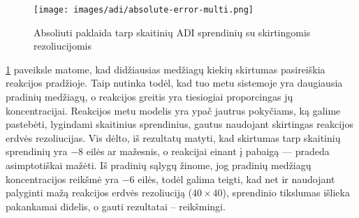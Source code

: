 \newpage

\begin{figure}[h!]
  \centering
  \texttt{[image: images/adi/absolute-error-multi.png]}
  \caption{Absoliuti paklaida tarp skaitinių ADI sprendinių su skirtingomis rezoliucijomis}
  \label{fig:adi-numerical-solution-absolute-error}
\end{figure}

\ref{fig:adi-numerical-solution-absolute-error} paveiksle matome, kad didžiausias medžiagų kiekių skirtumas pasireiškia reakcijos pradžioje. Taip nutinka todėl, kad tuo metu sistemoje yra daugiausia pradinių medžiagų, o reakcijos greitis yra tiesiogiai proporcingas jų koncentracijai. Reakcijos metu modelis yra ypač jautrus pokyčiams, ką galime pastebėti, lygindami skaitinius sprendinius, gautus naudojant skirtingas reakcijos erdvės rezoliucijas. Vis dėlto, iš rezultatų matyti, kad skirtumas tarp skaitinių sprendinių yra $-8$ eilės ar mažesnis, o reakcijai einant į pabaigą — pradeda asimptotiškai mažėti. Iš pradinių sąlygų žinome, jog pradinių medžiagų koncentracijos reikšmė yra $-6$ eilės, todėl galima teigti, kad net ir naudojant palyginti mažą reakcijos erdvės rezoliuciją ($40\times40$), sprendinio tikslumas išlieka pakankamai didelis, o gauti rezultatai -- reikšmingi.
